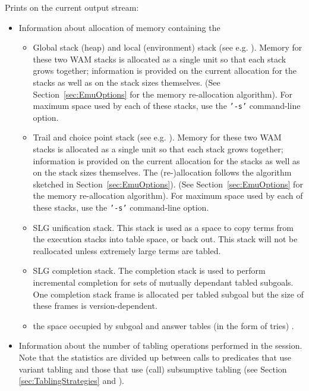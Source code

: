 \begin{description}
 Prints on the current
    output stream: 
\begin{itemize} 
\item Information about allocation of memory  containing the 
\begin{itemize} 
\item Global stack (heap) and local (environment) stack (see e.g.
\cite{AitK90}). Memory for these two WAM stacks is allocated as a
single unit so that each stack grows together; information is provided
on the current allocation for the stacks as well as on the stack sizes
themselves.  (See Section~\ref{sec:EmuOptions} for the memory
re-allocation algorithm).  For maximum space used by each of these
stacks, use the {\tt '-s'} command-line option.
%
\item Trail and choice point stack (see e.g. \cite{AitK90}).  Memory
for these two WAM stacks is allocated as a single unit so that each
stack grows together; information is provided on the current
allocation for the stacks as well as on the stack sizes themselves.
The (re-)allocation follows the algorithm sketched in
Section~\ref{sec:EmuOptions}).  (See Section~\ref{sec:EmuOptions} for
the memory re-allocation algorithm).  For maximum space used by each
of these stacks, use the {\tt '-s'} command-line option.
\item SLG unification stack.  This stack is used as a space to copy
terms from the execution stacks into table space, or back out.  This
stack will not be reallocated unless extremely large terms are tabled.
%
\item SLG completion stack.  The completion stack is used to perform
incremental completion for sets of mutually dependant tabled
subgoals.  One completion stack frame is allocated per tabled subgoal
\cite{SaSw98} but the size of these frames is version-dependent.
%
\item the space occupied by subgoal and answer tables (in the form of
tries) \cite{RRSSW98}.
\end{itemize}
\item Information about the number of tabling operations performed in
the session.  Note that the statistics are divided up between calls to
predicates that use variant tabling and those that use (call)
subsumptive tabling (see Section \ref{sec:TablingStrategies} and
\cite{TST99}).
\begin{itemize}

\end{itemize}
\end{itemize}
\end{description}
